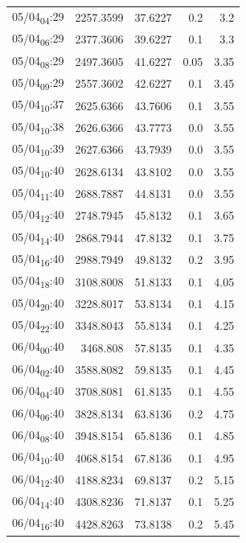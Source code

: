 \documentclass[11pt]{article}
\begin{document}
\begin{center}
\begin{tabular}{lrrrr}
05/04\textsubscript{04}:29 & 2257.3599 & 37.6227 & 0.2 & 3.2\\[0pt]
05/04\textsubscript{06}:29 & 2377.3606 & 39.6227 & 0.1 & 3.3\\[0pt]
05/04\textsubscript{08}:29 & 2497.3605 & 41.6227 & 0.05 & 3.35\\[0pt]
05/04\textsubscript{09}:29 & 2557.3602 & 42.6227 & 0.1 & 3.45\\[0pt]
05/04\textsubscript{10}:37 & 2625.6366 & 43.7606 & 0.1 & 3.55\\[0pt]
05/04\textsubscript{10}:38 & 2626.6366 & 43.7773 & 0.0 & 3.55\\[0pt]
05/04\textsubscript{10}:39 & 2627.6366 & 43.7939 & 0.0 & 3.55\\[0pt]
05/04\textsubscript{10}:40 & 2628.6134 & 43.8102 & 0.0 & 3.55\\[0pt]
05/04\textsubscript{11}:40 & 2688.7887 & 44.8131 & 0.0 & 3.55\\[0pt]
05/04\textsubscript{12}:40 & 2748.7945 & 45.8132 & 0.1 & 3.65\\[0pt]
05/04\textsubscript{14}:40 & 2868.7944 & 47.8132 & 0.1 & 3.75\\[0pt]
05/04\textsubscript{16}:40 & 2988.7949 & 49.8132 & 0.2 & 3.95\\[0pt]
05/04\textsubscript{18}:40 & 3108.8008 & 51.8133 & 0.1 & 4.05\\[0pt]
05/04\textsubscript{20}:40 & 3228.8017 & 53.8134 & 0.1 & 4.15\\[0pt]
05/04\textsubscript{22}:40 & 3348.8043 & 55.8134 & 0.1 & 4.25\\[0pt]
06/04\textsubscript{00}:40 & 3468.808 & 57.8135 & 0.1 & 4.35\\[0pt]
06/04\textsubscript{02}:40 & 3588.8082 & 59.8135 & 0.1 & 4.45\\[0pt]
06/04\textsubscript{04}:40 & 3708.8081 & 61.8135 & 0.1 & 4.55\\[0pt]
06/04\textsubscript{06}:40 & 3828.8134 & 63.8136 & 0.2 & 4.75\\[0pt]
06/04\textsubscript{08}:40 & 3948.8154 & 65.8136 & 0.1 & 4.85\\[0pt]
06/04\textsubscript{10}:40 & 4068.8154 & 67.8136 & 0.1 & 4.95\\[0pt]
06/04\textsubscript{12}:40 & 4188.8234 & 69.8137 & 0.2 & 5.15\\[0pt]
06/04\textsubscript{14}:40 & 4308.8236 & 71.8137 & 0.1 & 5.25\\[0pt]
06/04\textsubscript{16}:40 & 4428.8263 & 73.8138 & 0.2 & 5.45\\[0pt]

\end{tabular}
\end{center}
\end{document}
